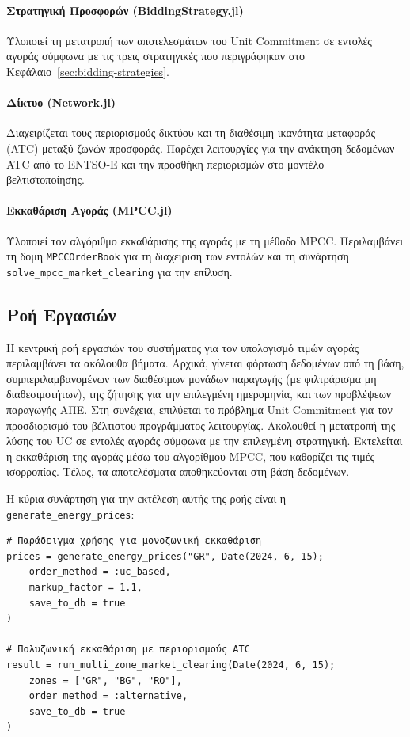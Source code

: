 \paragraph{Στρατηγική Προσφορών (BiddingStrategy.jl)}
Υλοποιεί τη μετατροπή των αποτελεσμάτων του Unit Commitment σε εντολές αγοράς σύμφωνα με τις τρεις στρατηγικές που περιγράφηκαν στο Κεφάλαιο~\ref{sec:bidding-strategies}.

\paragraph{Δίκτυο (Network.jl)}
Διαχειρίζεται τους περιορισμούς δικτύου και τη διαθέσιμη ικανότητα μεταφοράς (ATC) μεταξύ ζωνών προσφοράς. Παρέχει λειτουργίες για την ανάκτηση δεδομένων ATC από το ENTSO-E και την προσθήκη περιορισμών στο μοντέλο βελτιστοποίησης.

\paragraph{Εκκαθάριση Αγοράς (MPCC.jl)}
Υλοποιεί τον αλγόριθμο εκκαθάρισης της αγοράς με τη μέθοδο MPCC. Περιλαμβάνει τη δομή \texttt{MPCCOrderBook} για τη διαχείριση των εντολών και τη συνάρτηση \texttt{solve\_mpcc\_market\_clearing} για την επίλυση.

\subsection{Ροή Εργασιών}
\label{subsec:workflow}

Η κεντρική ροή εργασιών του συστήματος για τον υπολογισμό τιμών αγοράς περιλαμβάνει τα ακόλουθα βήματα. Αρχικά, γίνεται φόρτωση δεδομένων από τη βάση, συμπεριλαμβανομένων των διαθέσιμων μονάδων παραγωγής (με φιλτράρισμα μη διαθεσιμοτήτων), της ζήτησης για την επιλεγμένη ημερομηνία, και των προβλέψεων παραγωγής ΑΠΕ. Στη συνέχεια, επιλύεται το πρόβλημα Unit Commitment για τον προσδιορισμό του βέλτιστου προγράμματος λειτουργίας. Ακολουθεί η μετατροπή της λύσης του UC σε εντολές αγοράς σύμφωνα με την επιλεγμένη στρατηγική. Εκτελείται η εκκαθάριση της αγοράς μέσω του αλγορίθμου MPCC, που καθορίζει τις τιμές ισορροπίας. Τέλος, τα αποτελέσματα αποθηκεύονται στη βάση δεδομένων.

Η κύρια συνάρτηση για την εκτέλεση αυτής της ροής είναι η \texttt{generate\_energy\_prices}:

\begin{samepage}
\begin{verbatim}
# Παράδειγμα χρήσης για μονοζωνική εκκαθάριση
prices = generate_energy_prices("GR", Date(2024, 6, 15);
    order_method = :uc_based,
    markup_factor = 1.1,
    save_to_db = true
)

# Πολυζωνική εκκαθάριση με περιορισμούς ATC
result = run_multi_zone_market_clearing(Date(2024, 6, 15);
    zones = ["GR", "BG", "RO"],
    order_method = :alternative,
    save_to_db = true
)
\end{verbatim}
\end{samepage}

